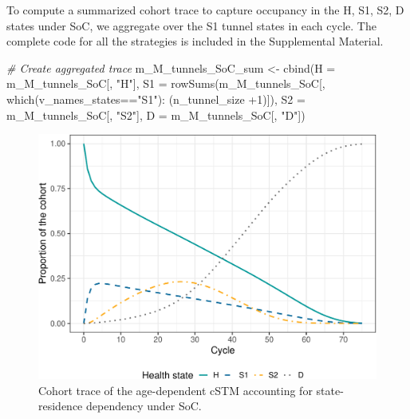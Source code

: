 \documentclass[
]{article}
\newenvironment{Shaded}{\begin{snugshade}}{\end{snugshade}}
\newcommand{\AttributeTok}[1]{\textcolor[rgb]{0.77,0.63,0.00}{#1}}
\newcommand{\CommentTok}[1]{\textcolor[rgb]{0.56,0.35,0.01}{\textit{#1}}}
\newcommand{\DecValTok}[1]{\textcolor[rgb]{0.00,0.00,0.81}{#1}}
\newcommand{\FunctionTok}[1]{\textcolor[rgb]{0.00,0.00,0.00}{#1}}
\newcommand{\NormalTok}[1]{#1}
\newcommand{\OtherTok}[1]{\textcolor[rgb]{0.56,0.35,0.01}{#1}}
\newcommand{\SpecialCharTok}[1]{\textcolor[rgb]{0.00,0.00,0.00}{#1}}
\newcommand{\StringTok}[1]{\textcolor[rgb]{0.31,0.60,0.02}{#1}}
\begin{document}
To compute a summarized cohort trace to capture occupancy in the H, S1, S2, D states under SoC, we aggregate over the S1 tunnel states in each cycle. The complete code for all the strategies is included in the Supplemental Material.

\begin{Shaded}
\begin{Highlighting}[]
\CommentTok{\# Create aggregated trace}
\NormalTok{m\_M\_tunnels\_SoC\_sum }\OtherTok{\textless{}{-}} \FunctionTok{cbind}\NormalTok{(}\AttributeTok{H =}\NormalTok{ m\_M\_tunnels\_SoC[, }\StringTok{"H"}\NormalTok{], }
                             \AttributeTok{S1 =} \FunctionTok{rowSums}\NormalTok{(m\_M\_tunnels\_SoC[, }\FunctionTok{which}\NormalTok{(v\_names\_states}\SpecialCharTok{==}\StringTok{"S1"}\NormalTok{)}\SpecialCharTok{:}
\NormalTok{                                                        (n\_tunnel\_size }\SpecialCharTok{+}\DecValTok{1}\NormalTok{)]), }
                             \AttributeTok{S2 =}\NormalTok{ m\_M\_tunnels\_SoC[, }\StringTok{"S2"}\NormalTok{],}
                             \AttributeTok{D =}\NormalTok{ m\_M\_tunnels\_SoC[, }\StringTok{"D"}\NormalTok{])}
\end{Highlighting}
\end{Shaded}

\begin{figure}[H]

{\centering \includegraphics{figs/Sick-Sicker-Trace-HistDep-1} 

}

\caption{Cohort trace of the age-dependent cSTM accounting for state-residence dependency under SoC.}\label{fig:Sick-Sicker-Trace-HistDep}
\end{figure}
\end{document}
